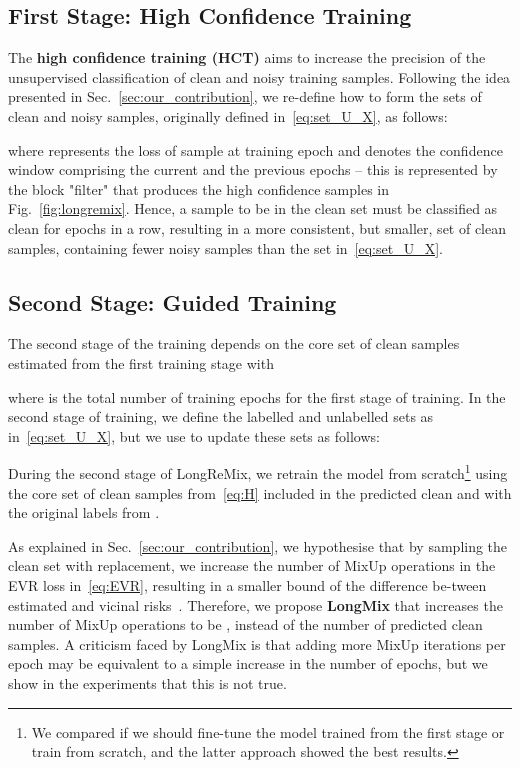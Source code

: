 \documentclass{article}
\begin{document}
\subsection{First Stage: High Confidence Training}
\label{sec:HCT}

The \textbf{high confidence training (HCT)} aims to increase the precision of the unsupervised classification of clean and noisy training samples.  Following the idea presented in Sec.~\ref{sec:our_contribution}, 
we re-define how to form the sets of clean and noisy samples, originally defined in~\eqref{eq:set_U_X}, as follows:

where  represents the loss of sample  at training epoch  and  denotes the confidence window comprising the current and the previous  epochs -- this is represented by the block "filter" that produces the high confidence samples in Fig.~\ref{fig:longremix}.  Hence, a sample to be in the clean set  must be classified as clean for  epochs in a row, resulting in a more consistent, but smaller, set of clean samples, containing fewer noisy samples than the set in~\eqref{eq:set_U_X}.






\subsection{Second Stage: Guided Training}
\label{sec:guided_training}

The second stage of the training depends on the core set of clean samples estimated from the first training stage with

where  is the total number of training epochs for the first stage of training. In the second stage of training, we define the labelled and unlabelled sets as in~\eqref{eq:set_U_X}, but we use  to update these sets as follows:



During the second stage of LongReMix, we retrain the model from scratch\footnote{We compared 
if we should fine-tune the model trained from the first stage or train from scratch, and the latter approach showed the best results.} using the core set of clean samples  from~\eqref{eq:H} included in the predicted clean and with the original labels from . 









As explained in Sec.~\ref{sec:our_contribution}, we hypothesise that by sampling the clean set with replacement, we increase the number of MixUp operations in the EVR loss in~\eqref{eq:EVR}, resulting in a smaller bound of the difference be-tween estimated and vicinal risks~\cite{zhang2018generalization}.  
Therefore, we propose \textbf{LongMix} that increases the number of MixUp operations to be , instead of the number of predicted clean samples. 
A criticism faced by LongMix is that adding more MixUp iterations per epoch may be equivalent to a simple increase in the number of epochs, but we show in the experiments that this is not true.
\end{document}
